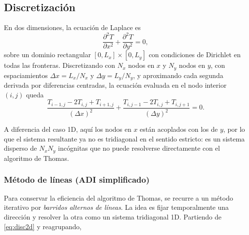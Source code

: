 \documentclass[12pt,twocolumn]{article}
\begin{document}
\subsection{Discretización}

En dos dimensiones, la ecuación de Laplace es
$$
\frac{\partial^2 T}{\partial x^2} + \frac{\partial^2 T}{\partial y^2} = 0,
$$
sobre un dominio rectangular $[0,L_x]\times[0,L_y]$ con condiciones de Dirichlet en todas las fronteras. Discretizando con $N_x$ nodos en $x$ y $N_y$ nodos en $y$, con espaciamientos $\Delta x = L_x/N_x$ y $\Delta y = L_y/N_y$, y aproximando cada segunda derivada por diferencias centradas, la ecuación evaluada en el nodo interior $(i,j)$ queda
\begin{equation}
  \frac{T_{i-1,j} - 2T_{i,j} + T_{i+1,j}}{(\Delta x)^2}
  +\frac{T_{i,j-1} - 2T_{i,j} + T_{i,j+1}}{(\Delta y)^2} = 0.
  \label{eq:disc2d}
\end{equation}

A diferencia del caso 1D, aquí los nodos en $x$ están acoplados con los de $y$, por lo que el sistema resultante ya no es tridiagonal en el sentido estricto: es un sistema disperso de $N_x N_y$ incógnitas que no puede resolverse directamente con el algoritmo de Thomas.

\subsubsection*{Método de líneas (ADI simplificado)}

Para conservar la eficiencia del algoritmo de Thomas, se recurre a un método iterativo por \emph{barridos alternos de líneas}. La idea es fijar temporalmente una dirección y resolver la otra como un sistema tridiagonal 1D. Partiendo de \eqref{eq:disc2d} y reagrupando,
\end{document}
